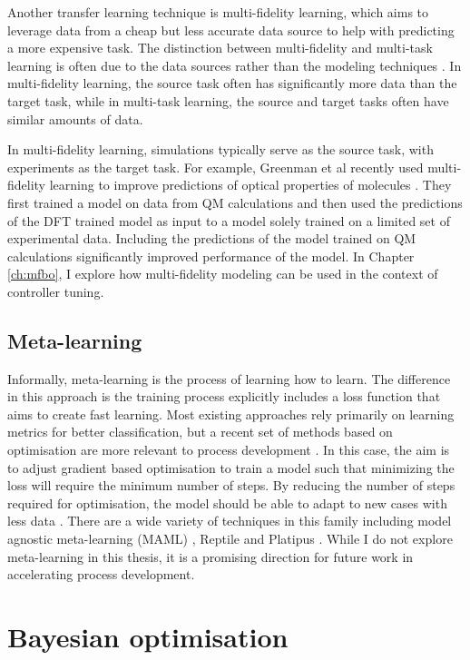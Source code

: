 Another transfer learning technique is multi-fidelity learning, which aims to leverage data from a cheap but less accurate data source to help with predicting a more expensive task. The distinction between multi-fidelity and multi-task learning is often due to the data sources rather than the modeling techniques \cite{Folch2023, Perdikaris2016, Pan2017, Tran2020, Greenman2022}. In multi-fidelity learning, the source task often has significantly more data than the target task, while in multi-task learning, the source and target tasks often have similar amounts of data. 

In multi-fidelity learning, simulations typically serve as the source task, with experiments as the target task. For example, Greenman et al recently used multi-fidelity learning to improve predictions of optical properties of molecules \cite{Greenman2022}. They first trained a model on data from QM calculations and then used the predictions of the DFT trained model as input to a model solely trained on a limited set of experimental data. Including the predictions of the model trained on QM calculations significantly improved performance of the model. In Chapter \ref{ch:mfbo}, I explore how multi-fidelity modeling can be used in the context of controller tuning.

\subsection{Meta-learning}

Informally, meta-learning is the process of learning how to learn. The difference in this approach is the training process explicitly includes a loss function that aims to create fast learning. Most existing approaches rely primarily on learning metrics for better classification, but a recent set of methods based on optimisation are more relevant to process development \cite{Huisman2021}.  In this case, the aim is to adjust gradient based optimisation to train a model such that minimizing the loss will require the minimum number of steps. By reducing the number of steps required for optimisation, the model should be able to adapt to new cases with less data \cite{Fingerhut2017}. There are a wide variety of techniques in this family including model agnostic meta-learning (MAML) \cite{Finn2017}, Reptile \cite{Nichols2018} and Platipus \cite{Finn2018}. While I do not explore meta-learning in this thesis, it is a promising direction for future work in accelerating process development.


\section{Bayesian optimisation}

